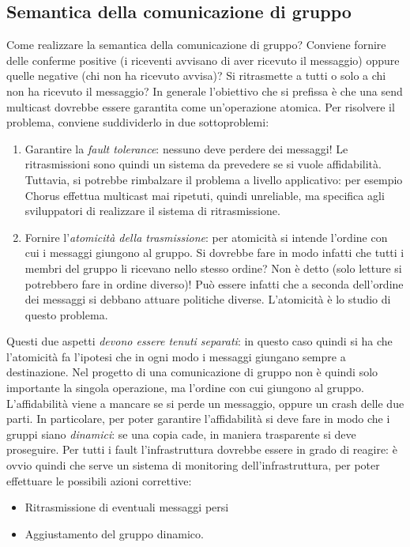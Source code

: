 \subsection{Semantica della comunicazione di gruppo}
Come realizzare la semantica della comunicazione di gruppo? Conviene fornire delle conferme positive (i riceventi
avvisano di aver ricevuto il messaggio) oppure quelle negative (chi non ha ricevuto avvisa)? Si ritrasmette a tutti o
solo a chi non ha ricevuto il messaggio?
In generale l'obiettivo che si prefissa è che una send multicast dovrebbe essere garantita come un'operazione atomica.
Per risolvere il problema, conviene suddividerlo in due sottoproblemi:
\begin{enumerate}
 \item Garantire la \textit{fault tolerance}: nessuno deve perdere dei messaggi! Le ritrasmissioni sono quindi un
 sistema da prevedere se si vuole affidabilità.
 Tuttavia, si potrebbe rimbalzare il problema a livello applicativo: per esempio Chorus effettua multicast mai 
 ripetuti, quindi unreliable, ma specifica agli sviluppatori di realizzare il sistema di ritrasmissione.
 \item Fornire l'\textit{atomicità della trasmissione}: per atomicità si intende l'ordine con cui i messaggi giungono
 al gruppo. Si dovrebbe fare in modo infatti che tutti i membri del gruppo li ricevano nello stesso ordine? Non è
 detto (solo letture si potrebbero fare in ordine diverso)! Può essere infatti che a seconda dell'ordine dei messaggi
 si debbano attuare politiche diverse. L'atomicità è lo studio di questo problema.
\end{enumerate}
Questi due aspetti \textit{devono essere tenuti separati}: in questo caso quindi si ha che l'atomicità fa l'ipotesi
che in ogni modo i messaggi giungano sempre a destinazione. Nel progetto di una comunicazione di gruppo non è quindi
solo importante la singola operazione, ma l'ordine con cui giungono al gruppo.
L'affidabilità viene a mancare se si perde un messaggio, oppure un crash delle due parti. In particolare, per poter
garantire l'affidabilità si deve fare in modo che i gruppi siano \textit{dinamici}: se una copia cade, in maniera
trasparente si deve proseguire. Per tutti i fault l'infrastruttura dovrebbe essere in grado di reagire: è ovvio quindi
che serve un sistema di monitoring dell'infrastruttura, per poter effettuare le possibili azioni correttive:
\begin{itemize}
 \item Ritrasmissione di eventuali messaggi persi
 \item Aggiustamento del gruppo dinamico.
\end{itemize}

